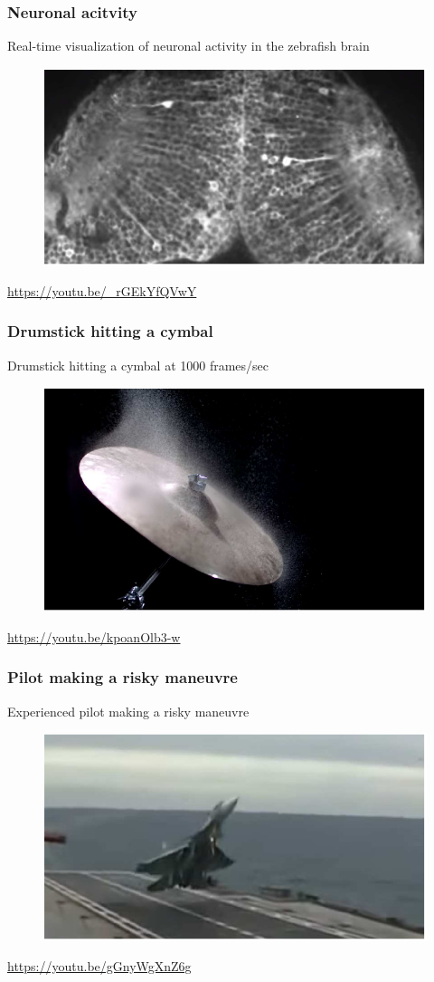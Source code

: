 \begin{frame}
	\frametitle{Neuronal acitvity}
	Real-time visualization of neuronal activity in the zebrafish brain
	\begin{figure}
		\includegraphics[scale=0.7]{neuronal_activity}
	\end{figure}
	\url{https://youtu.be/_rGEkYfQVwY}
\end{frame}

\begin{frame}
	\frametitle{Drumstick hitting a cymbal}
	Drumstick hitting a cymbal at 1000 frames/sec
	\begin{figure}
		\includegraphics[scale=.6]{cymbal}
	\end{figure}
	\url{https://youtu.be/kpoanOlb3-w}
\end{frame}

\begin{frame}
	\frametitle{Pilot making a risky maneuvre}
	Experienced pilot making a risky maneuvre
	\begin{figure}
		\includegraphics[scale=0.7]{risky_maneuvre}
	\end{figure}
	\url{https://youtu.be/gGnyWgXnZ6g}
\end{frame}

